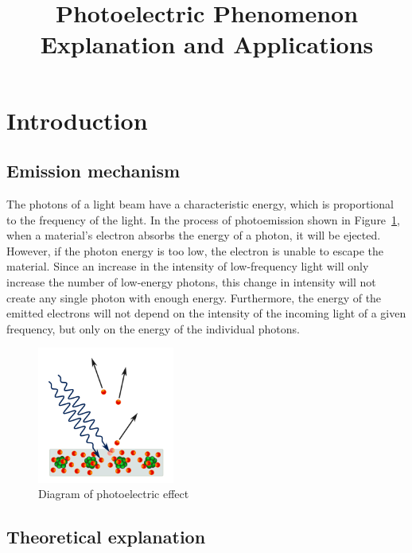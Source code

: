 \documentclass[stu, a4paper, 12pt, floatsintext]{apa7}
\title{Photoelectric Phenomenon Explanation and Applications}
\begin{document}
\maketitle
\tableofcontents
\newpage

\section{Introduction}

\subsection{Emission mechanism}

The photons of a light beam have a characteristic energy, which is proportional
to the frequency of the light. In the process of photoemission shown in
Figure~\ref{fig:photoelectric}, when a material's electron absorbs the energy of
a photon, it will be ejected. However, if the photon energy is too low, the
electron is unable to escape the material. Since an increase in the intensity of
low-frequency light will only increase the number of low-energy photons, this
change in intensity will not create any single photon with enough energy.
Furthermore, the energy of the emitted electrons will not depend on the
intensity of the incoming light of a given frequency, but only on the energy of
the individual photons.

\begin{figure}[htpb]
    \centering
    \includegraphics[width=0.4\textwidth]{imgs/photoelectric.png}
    \caption{Diagram of photoelectric effect}
    \label{fig:photoelectric}
\end{figure}

\subsection{Theoretical explanation}
\end{document}
